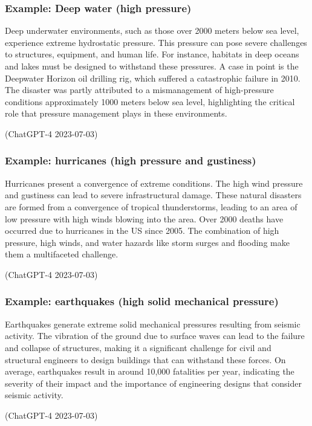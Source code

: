 \subsubsection{Example: Deep water (high pressure)}
\begin{quoting}
    Deep underwater environments, such as those over 2000 meters below sea level, experience extreme hydrostatic pressure. This pressure can pose severe challenges to structures, equipment, and human life. For instance, habitats in deep oceans and lakes must be designed to withstand these pressures. A case in point is the Deepwater Horizon oil drilling rig, which suffered a catastrophic failure in 2010. The disaster was partly attributed to a mismanagement of high-pressure conditions approximately 1000 meters below sea level, highlighting the critical role that pressure management plays in these environments.

    (ChatGPT-4 2023-07-03)
\end{quoting}
\subsubsection{Example: hurricanes (high pressure and gustiness)}
\begin{quoting}
    Hurricanes present a convergence of extreme conditions. The high wind pressure and gustiness can lead to severe infrastructural damage. These natural disasters are formed from a convergence of tropical thunderstorms, leading to an area of low pressure with high winds blowing into the area. Over 2000 deaths have occurred due to hurricanes in the US since 2005. The combination of high pressure, high winds, and water hazards like storm surges and flooding make them a multifaceted challenge.

    (ChatGPT-4 2023-07-03)
\end{quoting}
\subsubsection{Example: earthquakes (high solid mechanical pressure)}
\begin{quoting}
    Earthquakes generate extreme solid mechanical pressures resulting from seismic activity. The vibration of the ground due to surface waves can lead to the failure and collapse of structures, making it a significant challenge for civil and structural engineers to design buildings that can withstand these forces. On average, earthquakes result in around 10,000 fatalities per year, indicating the severity of their impact and the importance of engineering designs that consider seismic activity.

    (ChatGPT-4 2023-07-03)
\end{quoting}
